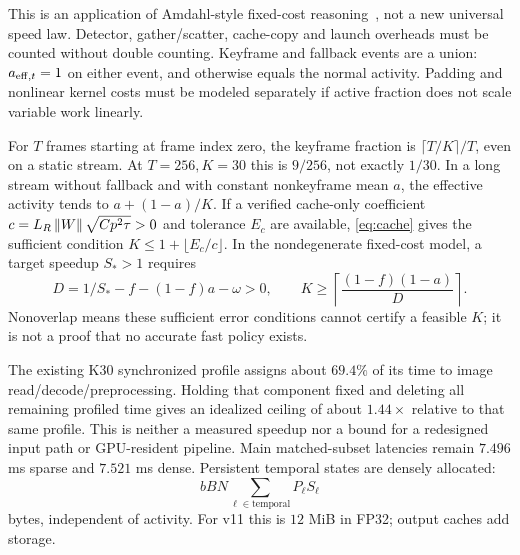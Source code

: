 This is an application of Amdahl-style fixed-cost reasoning~\cite{amdahl1967},
not a new universal speed law. Detector, gather/scatter, cache-copy and launch
overheads must be counted without double counting. Keyframe and fallback
events are a union: $a_{{\rm eff},t}=1$ on either event, and otherwise equals
the normal activity. Padding and nonlinear kernel costs must be modeled
separately if active fraction does not scale variable work linearly.

For $T$ frames starting at frame index zero, the keyframe fraction is
$\lceil T/K\rceil/T$, even on a static stream. At $T=256,K=30$ this is
$9/256$, not exactly $1/30$. In a long stream without fallback and with
constant nonkeyframe mean $a$, the effective activity tends to
$a+(1-a)/K$. If a verified cache-only coefficient
$c=L_R\left\lVert W\right\rVert\sqrt{Cp^2\tau}>0$ and tolerance $E_c$ are available,
\eqref{eq:cache} gives the sufficient condition
$K\le1+\lfloor E_c/c\rfloor$. In the nondegenerate fixed-cost model,
a target speedup $S_*>1$ requires
\begin{equation}
 D=1/S_*-f-(1-f)a-\omega>0,\qquad
 K\ge\left\lceil\frac{(1-f)(1-a)}{D}\right\rceil.
\end{equation}
Nonoverlap means these sufficient error conditions cannot certify a feasible
$K$; it is not a proof that no accurate fast policy exists.

The existing K30 synchronized profile assigns about $69.4\%$ of its time
to image read/decode/preprocessing. Holding that component fixed and deleting
all remaining profiled time gives an idealized ceiling of about $1.44\times$
relative to that same profile. This is neither a measured speedup nor a bound
for a redesigned input path or GPU-resident pipeline. Main matched-subset
latencies remain $7.496$ ms sparse and $7.521$ ms dense.
Persistent temporal states are densely allocated:
\[ bBN\sum_{\ell\in\mathrm{temporal}}P_\ell S_\ell \]
bytes, independent of activity.
For v11 this is $12$ MiB in FP32; output caches add storage.

